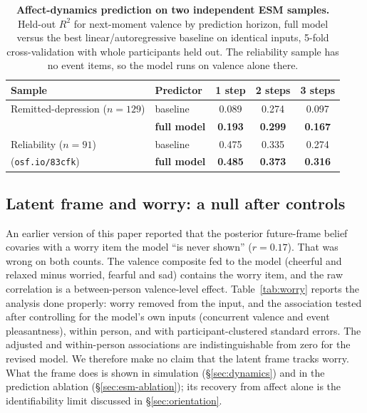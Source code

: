 \documentclass[11pt,a4paper]{article}
\begin{document}
\begin{table}[htbp]
\centering\small
\caption{\textbf{Affect-dynamics prediction on two independent ESM samples.} Held-out
$R^2$ for next-moment valence by prediction horizon, full model versus the best
linear/autoregressive baseline on identical inputs, 5-fold cross-validation with whole
participants held out. The reliability sample has no event items, so the model runs on
valence alone there.}
\label{tab:esm}
\begin{tabular}{llccc}
\toprule
Sample & Predictor & 1 step & 2 steps & 3 steps \\
\midrule
Remitted-depression ($n{=}129$) & baseline & 0.089 & 0.274 & 0.097 \\
\citep{bringmann2013,geschwind2011} & \textbf{full model} & \textbf{0.193} & \textbf{0.299} & \textbf{0.167} \\
\midrule
Reliability ($n{=}91$) & baseline & 0.475 & 0.335 & 0.274 \\
(\texttt{osf.io/83cfk}) & \textbf{full model} & \textbf{0.485} & \textbf{0.373} & \textbf{0.316} \\
\bottomrule
\end{tabular}
\end{table}

\subsection{Latent frame and worry: a null after controls}\label{sec:worry}
An earlier version of this paper reported that the posterior future-frame belief
covaries with a worry item the model ``is never shown'' ($r=0.17$). That was wrong on
both counts. The valence composite fed to the model (cheerful and relaxed minus
worried, fearful and sad) contains the worry item, and the raw correlation is a
between-person valence-level effect. Table~\ref{tab:worry} reports the analysis done
properly: worry removed from the input, and the association tested after controlling
for the model's own inputs (concurrent valence and event pleasantness), within person,
and with participant-clustered standard errors. The adjusted and within-person
associations are indistinguishable from zero for the revised model. We therefore make
no claim that the latent frame tracks worry. What the frame does is shown in
simulation (\S\ref{sec:dynamics}) and in the prediction ablation
(\S\ref{sec:esm-ablation}); its recovery from affect alone is the identifiability
limit discussed in \S\ref{sec:orientation}.
\end{document}
